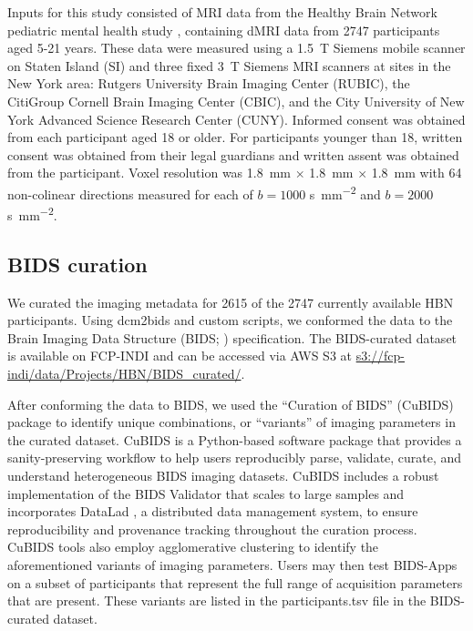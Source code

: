 \documentclass[9pt,lineno]{elife}
\begin{document}
Inputs for this study consisted of MRI data from the Healthy Brain Network
pediatric mental health study \citep{alexander2017-yc}, containing dMRI data from
\num{2747} participants aged 5-21 years. These data were measured using a
\qty{1.5}{\tesla} Siemens mobile scanner on Staten Island (SI) and three fixed
\qty{3}{\tesla} Siemens MRI scanners at sites in the New York area: Rutgers
University Brain Imaging Center (RUBIC), the CitiGroup Cornell Brain Imaging
Center (CBIC), and the City University of New York Advanced Science Research
Center (CUNY). Informed consent was obtained from each participant aged 18 or
older. For participants younger than 18, written consent was obtained from their
legal guardians and written assent was obtained from the participant. Voxel
resolution was \qty{1.8}{\mm} $\times$ \qty{1.8}{\mm} $\times$ \qty{1.8}{\mm} with \num{64} non-colinear
directions measured for each of $b=1000$ \unit{\second \per \mm^{2}} and
$b=2000$ \unit{\second \per \mm^{2}}.

\subsection{BIDS curation}

We curated the imaging metadata for \num{2615} of the \num{2747} currently
available HBN participants. Using dcm2bids and custom scripts, we conformed the data
to the Brain Imaging Data Structure (BIDS; \citep{gorgolewski2016-lh})
specification. The BIDS-curated dataset is available on FCP-INDI and can be
accessed via AWS S3 at \url{s3://fcp-indi/data/Projects/HBN/BIDS_curated/}.


After conforming the data to BIDS, we used the ``Curation of BIDS'' (CuBIDS) \citep{sydney-covitz2022-cubids} package to identify unique combinations, or ``variants'' of imaging parameters in the curated dataset.
CuBIDS is a Python-based software package that provides a sanity-preserving workflow to help users reproducibly parse, validate, curate, and understand heterogeneous BIDS imaging datasets. CuBIDS includes a robust implementation of the BIDS Validator that scales to large samples and incorporates DataLad \cite{halchenko2021datalad}, a distributed data management system, to ensure reproducibility and provenance tracking throughout the curation process. CuBIDS tools also employ agglomerative clustering to identify the aforementioned variants of imaging parameters. Users may then test BIDS-Apps on a subset of participants that represent the full range of acquisition parameters that are present. These variants are listed in the participants.tsv file in the BIDS-curated dataset.
\end{document}

